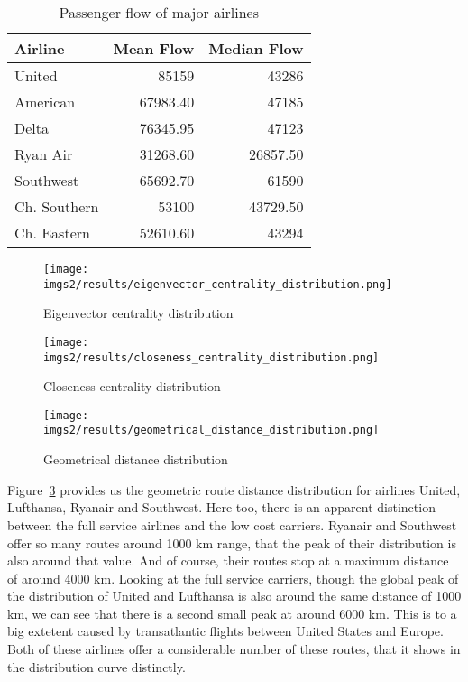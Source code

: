 \documentclass[twocolumn]{tum-article}
\begin{document}
\begin{table}[ht]
\begin{center}
 \begin{tabular}{| l | r | r |}
 \hline
 \textbf{Airline} & \textbf{Mean Flow} & \textbf{Median Flow} \\ 
 \hline
 United & 85159 & 43286 \\
 \hline
 American & 67983.40 & 47185 \\
 \hline
 Delta & 76345.95  & 47123 \\
 \hline
 Ryan Air & 31268.60 & 26857.50 \\
 \hline
 Southwest & 65692.70  & 61590 \\
 \hline
 Ch. Southern & 53100  & 43729.50 \\
 \hline
 Ch. Eastern & 52610.60  & 43294 \\
 \hline
 \end{tabular}
\caption{Passenger flow of major airlines}
\label{Tab:passenger_flow_airlines}
\end{center}
\end{table}

\begin{figure}
        \centering
        \texttt{[image: imgs2/results/eigenvector\_centrality\_distribution.png]}
        \caption{
Eigenvector centrality distribution}
        \label{fig:eigen_distr}
\end{figure}

\begin{figure}
        \centering
        \texttt{[image: imgs2/results/closeness\_centrality\_distribution.png]}
        \caption{
Closeness centrality distribution}
        \label{fig:closeness_distr}
\end{figure}


\begin{figure}
        \centering
        \texttt{[image: imgs2/results/geometrical\_distance\_distribution.png]}
        \caption{
Geometrical distance distribution}
        \label{fig:geometric_distr}
\end{figure}

Figure~\ref{fig:geometric_distr} provides us the geometric route distance distribution for airlines United, Lufthansa, Ryanair and Southwest. Here too, there is an apparent distinction between the full service airlines and the low cost carriers. 	
Ryanair and Southwest offer so many routes around 1000 km range, that the peak of their distribution is also around that value.
And of course, their routes stop at a maximum distance of around 4000 km. 
Looking at the full service carriers, though the global peak of the distribution of United and Lufthansa is also around the same distance of 1000 km, we can see that there is a second small peak at around 6000 km. This is to a big extetent caused by transatlantic flights between United States and Europe. 
Both of these airlines offer a considerable number of these routes, that it shows in the distribution curve distinctly. 
\end{document}
